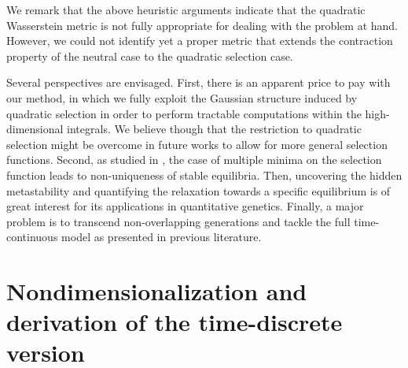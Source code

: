 \documentclass[reqno]{amsart}
\numberwithin{equation}{section}
\begin{document}
{We remark that the above heuristic arguments indicate that the quadratic Wasserstein metric is not fully appropriate for dealing with the problem at hand. However, we could not identify yet a proper metric that extends the contraction property of the neutral case to the quadratic selection case. 

Several perspectives are envisaged. First, there is an apparent price to pay with our method, in which we fully exploit the Gaussian structure induced by quadratic selection in order to perform tractable computations within the high-dimensional integrals. We believe though that the restriction to quadratic selection might be overcome in future works to allow for more general selection functions.  Second, as studied in \cite{CGP-19}, the case of multiple minima on the selection function leads to non-uniqueness of stable equilibria. Then, uncovering the hidden metastability and quantifying the relaxation towards a specific equilibrium is of great interest for its applications in quantitative genetics. Finally, a major problem is to transcend non-overlapping generations and tackle the full time-continuous model as presented in previous literature.


\appendix


\section{Nondimensionalization and derivation of the time-discrete version}\label{Appendix-nondimensionalization}

}
\end{document}
